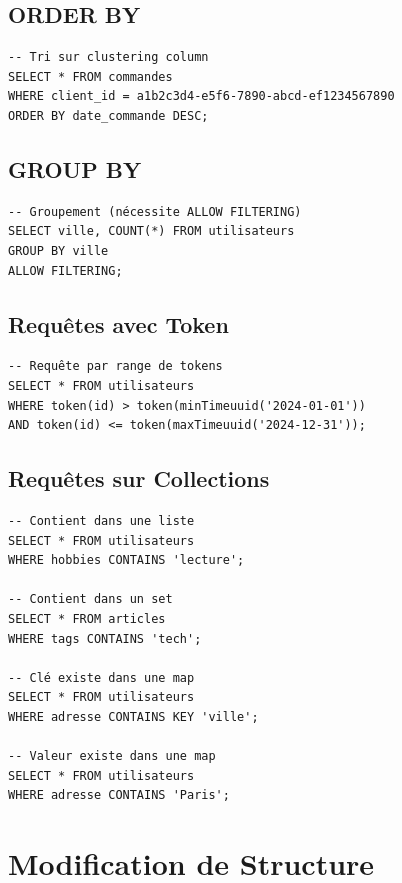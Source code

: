 \documentclass[11pt,a4paper]{article}
\begin{document}
\subsection{ORDER BY}

\begin{lstlisting}
-- Tri sur clustering column
SELECT * FROM commandes
WHERE client_id = a1b2c3d4-e5f6-7890-abcd-ef1234567890
ORDER BY date_commande DESC;
\end{lstlisting}

\subsection{GROUP BY}

\begin{lstlisting}
-- Groupement (nécessite ALLOW FILTERING)
SELECT ville, COUNT(*) FROM utilisateurs
GROUP BY ville
ALLOW FILTERING;
\end{lstlisting}

\subsection{Requêtes avec Token}

\begin{lstlisting}
-- Requête par range de tokens
SELECT * FROM utilisateurs
WHERE token(id) > token(minTimeuuid('2024-01-01'))
AND token(id) <= token(maxTimeuuid('2024-12-31'));
\end{lstlisting}

\subsection{Requêtes sur Collections}

\begin{lstlisting}
-- Contient dans une liste
SELECT * FROM utilisateurs
WHERE hobbies CONTAINS 'lecture';

-- Contient dans un set
SELECT * FROM articles
WHERE tags CONTAINS 'tech';

-- Clé existe dans une map
SELECT * FROM utilisateurs
WHERE adresse CONTAINS KEY 'ville';

-- Valeur existe dans une map
SELECT * FROM utilisateurs
WHERE adresse CONTAINS 'Paris';
\end{lstlisting}

\newpage

\section{Modification de Structure}
\end{document}

